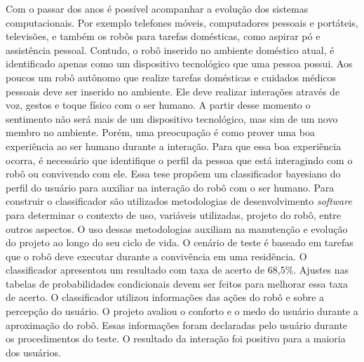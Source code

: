 
\begin{resumo}
Com o passar dos anos é possível acompanhar a evolução dos sistemas computacionais. Por exemplo telefones móveis, computadores pessoais e portáteis, televisões, e também os robôs para tarefas domésticas, como aspirar pó e assistência pessoal. Contudo, o robô inserido no ambiente doméstico atual, é identificado apenas como um dispositivo tecnológico que uma pessoa possui. Aos poucos um robô autônomo que realize tarefas domésticas e cuidados médicos pessoais deve ser inserido no ambiente. Ele deve realizar interações através de voz, gestos e toque físico com o ser humano. A partir desse momento o sentimento não será mais de um dispositivo tecnológico, mas sim de um novo membro no ambiente. Porém, uma preocupação é como prover uma boa experiência ao ser humano durante a interação. Para que essa boa experiência ocorra, é necessário que identifique o perfil da pessoa que está interagindo com o robô ou convivendo com ele. Essa tese propõem um classificador bayesiano do perfil do usuário para auxiliar na interação do robô com o ser humano. Para construir o classificador são utilizados metodologias de desenvolvimento \emph{software} para determinar o contexto de uso, variáveis utilizadas, projeto do robô, entre outros aspectos. O uso dessas metodologias auxiliam na manutenção e evolução do projeto ao longo do seu ciclo de vida. O cenário de teste é baseado em tarefas que o robô deve executar durante a convivência em uma residência. O classificador apresentou um resultado com taxa de acerto de 68,5\%. Ajustes nas tabelas de probabilidades condicionais devem ser feitos para melhorar essa taxa de acerto. O classificador utilizou informações das ações do robô e sobre a percepção do usuário. O projeto avaliou o conforto e o medo do usuário durante a aproximação do robô. Essas informações foram declaradas pelo usuário durante os procedimentos do teste. O resultado da interação foi positivo para a maioria dos usuários.



\end{resumo}
